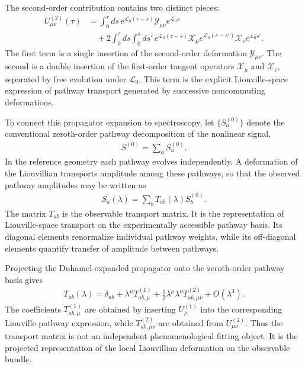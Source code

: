 The second-order contribution contains two distinct pieces:
\begin{align}
U^{(2)}_{\mu\nu}(\tau)
&=
\int_0^\tau ds\,
e^{\mathcal L_0(\tau-s)}
\mathcal Y_{\mu\nu}
e^{\mathcal L_0 s}
\nonumber\\
&\quad
+
2
\int_0^\tau ds
\int_0^s ds'\,
e^{\mathcal L_0(\tau-s)}
\mathcal X_\mu
e^{\mathcal L_0(s-s')}
\mathcal X_\nu
e^{\mathcal L_0s'} .
\label{eq:U2_duhamel_review}
\end{align}
The first term is a single insertion of the second-order
deformation \(\mathcal Y_{\mu\nu}\). The second is a double
insertion of the first-order tangent operators
\(\mathcal X_\mu\) and \(\mathcal X_\nu\), separated by free
evolution under \(\mathcal L_0\). This term is the explicit
Liouville-space expression of pathway transport generated by
successive noncommuting deformations.

To connect this propagator expansion to spectroscopy, let
\(\{S_a^{(0)}\}\) denote the conventional zeroth-order pathway
decomposition of the nonlinear signal,
\begin{align}
S^{(0)}
=
\sum_a S_a^{(0)} .
\end{align}
In the reference geometry each pathway evolves independently. A
deformation of the Liouvillian transports amplitude among these
pathways, so that the observed pathway amplitudes may be written
as
\begin{align}
S_a(\lambda)
=
\sum_b
T_{ab}(\lambda)
S_b^{(0)} .
\label{eq:pathway_transport_review}
\end{align}
The matrix \(T_{ab}\) is the observable transport matrix. It is
the representation of Liouville-space transport on the
experimentally accessible pathway basis. Its diagonal elements
renormalize individual pathway weights, while its off-diagonal
elements quantify transfer of amplitude between pathways.

Projecting the Duhamel-expanded propagator onto the zeroth-order
pathway basis gives
\begin{align}
T_{ab}(\lambda)
=
\delta_{ab}
+
\lambda^\mu T^{(1)}_{ab,\mu}
+
\frac12
\lambda^\mu\lambda^\nu
T^{(2)}_{ab,\mu\nu}
+
O(\lambda^3).
\label{eq:T_expansion_review}
\end{align}
The coefficients \(T^{(1)}_{ab,\mu}\) are obtained by inserting
\(U^{(1)}_\mu\) into the corresponding Liouville pathway
expression, while \(T^{(2)}_{ab,\mu\nu}\) are obtained from
\(U^{(2)}_{\mu\nu}\). Thus the transport matrix is not an
independent phenomenological fitting object. It is the projected
representation of the local Liouvillian deformation on the
observable bundle.

